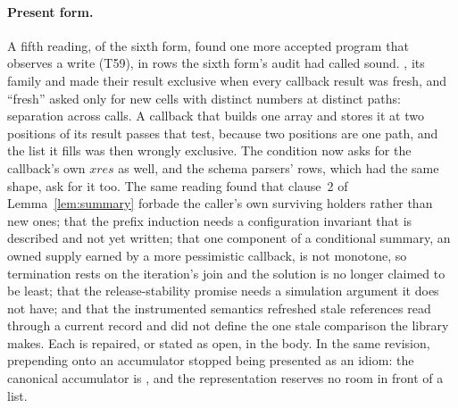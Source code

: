 \paragraph{Present form.} A fifth reading, of the sixth form, found one more accepted program that
observes a write (T59), in rows the sixth form's audit had called sound. , its family and
 made their result exclusive when every callback result was fresh, and ``fresh'' asked only
for new cells with distinct numbers at distinct paths: separation across calls. A callback that builds one
array and stores it at two positions of its result passes that test, because two positions are one path,
and the list it fills was then wrongly exclusive. The condition now asks for the callback's own
$\mathit{xres}$ as well, and the schema parsers' rows, which had the same shape, ask for it too. The same
reading found that clause~2 of Lemma~\ref{lem:summary} forbade the caller's own surviving holders rather
than new ones; that the prefix induction needs a configuration invariant that is described and not yet
written; that one component of a conditional summary, an owned supply earned by a more pessimistic
callback, is not monotone, so termination rests on the iteration's join and the solution is no longer
claimed to be least; that the release-stability promise needs a simulation argument it does not have; and
that the instrumented semantics refreshed stale references read through a current record and did not
define the one stale comparison the library makes. Each is repaired, or stated as open, in the body. In the
same revision, prepending onto an accumulator stopped being presented as an idiom: the canonical
accumulator is \code{[ …acc, x ]}, and the representation reserves no room in front of a list.
